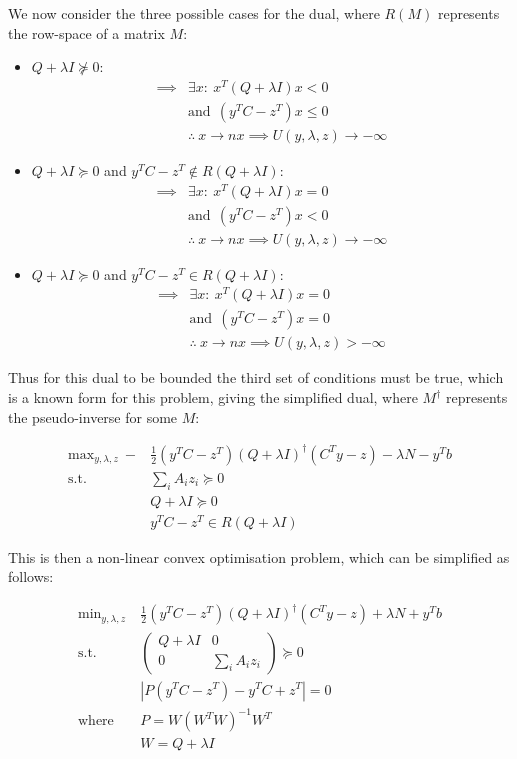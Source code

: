 \documentclass{article}
\begin{document}
We now consider the three possible cases for the dual, where $R(M)$ represents the row-space of a matrix $M$:

\begin{itemize}
\item $Q+\lambda I \not\succeq 0$:
	\begin{align}
		\implies &\exists x : ~ x^T (Q + \lambda I) x < 0 \\
				 &\text{and} ~~ (y^TC-z^T)x \le 0 \\
		&\therefore ~ x \to n x \implies U(y, \lambda, z) \to -\infty
	\end{align}
\item $Q+\lambda I \succeq 0$ and $y^TC-z^T \not \in R(Q+\lambda I)$:
	\begin{align}
		\implies &\exists x : ~ x^T (Q + \lambda I) x = 0 \\
				 &\text{and} ~~ (y^TC-z^T)x < 0 \\
		&\therefore ~ x \to n x \implies U(y, \lambda, z) \to -\infty
	\end{align}
\item $Q+\lambda I \succeq 0$ and $y^TC-z^T \in R(Q+\lambda I)$:
	\begin{align}
		\implies &\exists x : ~ x^T (Q + \lambda I) x = 0 \\
				 &\text{and} ~~ (y^TC-z^T)x = 0 \\
				 &\therefore ~ x \to n x \implies U(y, \lambda, z) > -\infty
	\end{align}
\end{itemize}

Thus for this dual to be bounded the third set of conditions must be true, which is a known form for this problem, giving the simplified dual, where $M^\dagger$ represents the pseudo-inverse for some $M$:

\begin{align}
	\text{max}_{y, \lambda, z} ~ -&\frac{1}{2} (y^T C - z^T) (Q+\lambda I)^\dagger (C^Ty - z) - \lambda N - y^T b \\ 
	\text{s.t.} ~~ &\sum_i A_i z_i \succeq 0 \\
				&Q+ \lambda I \succeq 0 \\
				&y^TC-z^T \in R(Q+\lambda I)
\end{align}

\pagebreak 

This is then a non-linear convex optimisation problem, which can be simplified as follows:

\begin{align}
	\text{min}_{y, \lambda, z} ~ &\frac{1}{2} (y^T C - z^T) (Q+\lambda I)^\dagger (C^Ty - z) + \lambda N + y^T b \\ 
	\text{s.t.} ~~ &\begin{pmatrix} Q+ \lambda I & 0 \\ 0 & \sum_i A_i z_i \end{pmatrix} \succeq 0 \\
			    &|P(y^TC-z^T)-y^T C+z^T| = 0 \\ 
				\text{where} ~~ &P = W (W^T W)^{-1} W^T \\
								&W = Q+\lambda I
\end{align}
\end{document}
